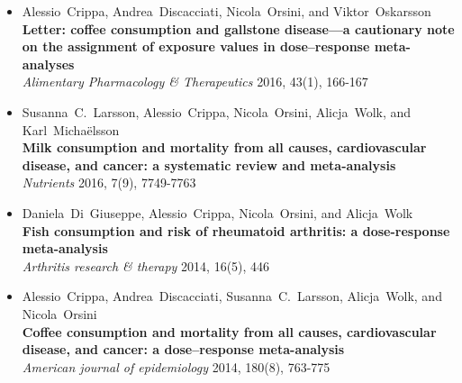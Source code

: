 \begin{itemize}
\item Alessio~Crippa, Andrea~Discacciati, Nicola~Orsini, and Viktor~Oskarsson \\ \textbf{Letter: coffee consumption and gallstone disease---a cautionary note on the assignment of exposure values in dose--response meta-analyses} \\ \textit{Alimentary Pharmacology \& Therapeutics} 2016, 43(1), 166-167
\item Susanna~C.~Larsson, Alessio~Crippa, Nicola~Orsini, Alicja~Wolk, and Karl~Micha{\"e}lsson \\ \textbf{Milk consumption and mortality from all causes, cardiovascular disease, and cancer: a systematic review and meta-analysis} \\ \textit{Nutrients} 2016, 7(9), 7749-7763
\item Daniela~Di~Giuseppe, Alessio~Crippa, Nicola~Orsini, and Alicja~Wolk \\ \textbf{Fish consumption and risk of rheumatoid arthritis: a dose-response meta-analysis} \\ \textit{Arthritis research \& therapy} 2014, 16(5), 446
\item Alessio~Crippa, Andrea~Discacciati, Susanna~C.~Larsson, Alicja~Wolk, and Nicola~Orsini \\ \textbf{Coffee consumption and mortality from all causes, cardiovascular disease, and cancer: a dose--response meta-analysis} \\ \textit{American journal of epidemiology} 2014, 180(8), 763-775
\end{itemize}

